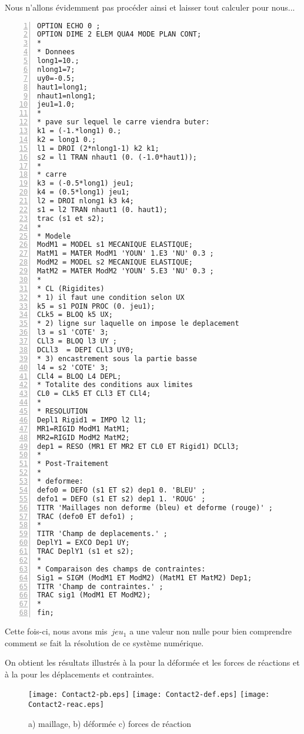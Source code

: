 Nous n'allons évidemment pas procéder ainsi et laisser \castem tout calculer pour nous...

\color{gris}\scriptsize
\begin{multicols}{2}
\begin{Verbatim}[numbers=left,numbersep=3pt]
OPTION ECHO 0 ;
OPTION DIME 2 ELEM QUA4 MODE PLAN CONT;
*
* Donnees
long1=10.;
nlong1=7;
uy0=-0.5;
haut1=long1;
nhaut1=nlong1;
jeu1=1.0;
*
* pave sur lequel le carre viendra buter:
k1 = (-1.*long1) 0.;
k2 = long1 0.;
l1 = DROI (2*nlong1-1) k2 k1;
s2 = l1 TRAN nhaut1 (0. (-1.0*haut1));
*
* carre
k3 = (-0.5*long1) jeu1;
k4 = (0.5*long1) jeu1;
l2 = DROI nlong1 k3 k4;
s1 = l2 TRAN nhaut1 (0. haut1);
trac (s1 et s2);
*
* Modele
ModM1 = MODEL s1 MECANIQUE ELASTIQUE;
MatM1 = MATER ModM1 'YOUN' 1.E3 'NU' 0.3 ;
ModM2 = MODEL s2 MECANIQUE ELASTIQUE;
MatM2 = MATER ModM2 'YOUN' 5.E3 'NU' 0.3 ;
*
* CL (Rigidites)
* 1) il faut une condition selon UX
k5 = s1 POIN PROC (0. jeu1);
CLk5 = BLOQ k5 UX;
* 2) ligne sur laquelle on impose le deplacement
l3 = s1 'COTE' 3;
CLl3 = BLOQ l3 UY ;
DCLl3  = DEPI CLl3 UY0;
* 3) encastrement sous la partie basse
l4 = s2 'COTE' 3;
CLl4 = BLOQ L4 DEPL;
* Totalite des conditions aux limites
CL0 = CLk5 ET CLl3 ET CLl4;
*
* RESOLUTION
Depl1 Rigid1 = IMPO l2 l1;
MR1=RIGID ModM1 MatM1;
MR2=RIGID ModM2 MatM2;
dep1 = RESO (MR1 ET MR2 ET CL0 ET Rigid1) DCLl3;
*
* Post-Traitement
*
* deformee:
defo0 = DEFO (s1 ET s2) dep1 0. 'BLEU' ;
defo1 = DEFO (s1 ET s2) dep1 1. 'ROUG' ;
TITR 'Maillages non deforme (bleu) et deforme (rouge)' ;
TRAC (defo0 ET defo1) ;
*
TITR 'Champ de deplacements.' ;
DeplY1 = EXCO Dep1 UY;
TRAC DeplY1 (s1 et s2);
*
* Comparaison des champs de contraintes:
Sig1 = SIGM (ModM1 ET ModM2) (MatM1 ET MatM2) Dep1;
TITR 'Champ de contraintes.' ;
TRAC sig1 (ModM1 ET ModM2);
*
fin;
\end{Verbatim}
\end{multicols}
\color{black}\normalsize

\medskip
Cette fois-ci, nous avons mis~$jeu_1$ a une valeur non nulle pour bien comprendre
comment se fait la résolution de ce système numérique.

On obtient les résultats illustrés à la  pour la déformée et les forces de réactions et à la 
pour les déplacements et contraintes.

\begin{figure}[ht]
  \texttt{[image: Contact2-pb.eps]} \hfill 
  \texttt{[image: Contact2-def.eps]}\hfill 
  \texttt{[image: Contact2-reac.eps]}
  \caption{\label{Fig-Cont21} a) maillage, b) déformée c) forces de réaction}
\end{figure}

